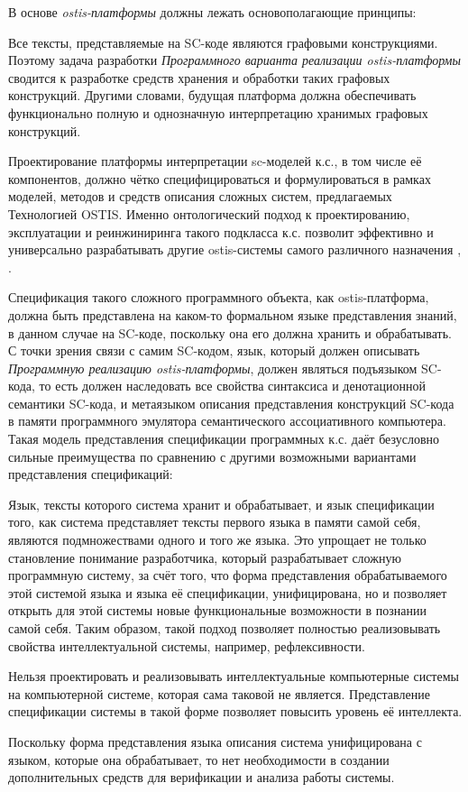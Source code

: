 В основе \textit{ostis-платформы} должны лежать основополагающие принципы:
\begin{textitemize}
    \item Все тексты, представляемые на SC-коде являются графовыми конструкциями. Поэтому задача разработки \textit{Программного варианта реализации ostis-платформы} сводится к разработке средств хранения и обработки таких графовых конструкций. Другими словами, будущая платформа должна обеспечивать функционально полную и однозначную интерпретацию хранимых графовых конструкций.
    \item Проектирование платформы интерпретации sc-моделей к.с., в том числе её компонентов, должно чётко специфицироваться и формулироваться в рамках моделей, методов и средств описания сложных систем, предлагаемых Технологией OSTIS. Именно онтологический подход к проектированию, эксплуатации и реинжиниринга такого подкласса к.с. позволит эффективно и универсально разрабатывать другие ostis-системы самого различного назначения \cite{Molorodov2019}, .
\end{textitemize}

Спецификация такого сложного программного объекта, как ostis-платформа, должна быть представлена на каком-то формальном языке представления знаний, в данном случае на SC-коде, поскольку она его должна хранить и обрабатывать. С точки зрения связи с самим SC-кодом, язык, который должен описывать \textit{Программную реализацию ostis-платформы}, должен являться подъязыком SC-кода, то есть должен наследовать все свойства синтаксиса и денотационной семантики SC-кода, и метаязыком описания представления конструкций SC-кода в памяти программного эмулятора семантического ассоциативного компьютера. Такая модель представления спецификации программных к.с. даёт безусловно сильные преимущества по сравнению с другими возможными вариантами представления спецификаций:
\begin{textitemize}
    \item Язык, тексты которого система хранит и обрабатывает, и язык спецификации того, как система представляет тексты первого языка в памяти самой себя, являются подмножествами одного и того же языка. Это упрощает не только становление понимание разработчика, который разрабатывает сложную программную систему, за счёт того, что форма представления обрабатываемого этой системой языка и языка её спецификации, унифицирована, но и позволяет открыть для этой системы новые функциональные возможности в познании самой себя. Таким образом, такой подход позволяет полностью реализовывать свойства интеллектуальной системы, например, рефлексивности.
    \item Нельзя проектировать и реализовывать интеллектуальные компьютерные системы на компьютерной системе, которая сама таковой не является. Представление спецификации системы в такой форме позволяет повысить уровень её интеллекта.
    \item Поскольку форма представления языка описания система унифицирована с языком, которые она обрабатывает, то нет необходимости в создании дополнительных средств для верификации и анализа работы системы.
\end{textitemize}

